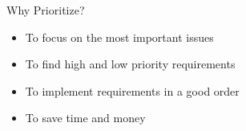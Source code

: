 \begin{Slide}{Why Prioritize?}
\begin{itemize}
\item To focus on the most important issues
\item To find high and low priority requirements
\item To implement requirements in a good order
\item To save time and money

\end{itemize}
\end{Slide}